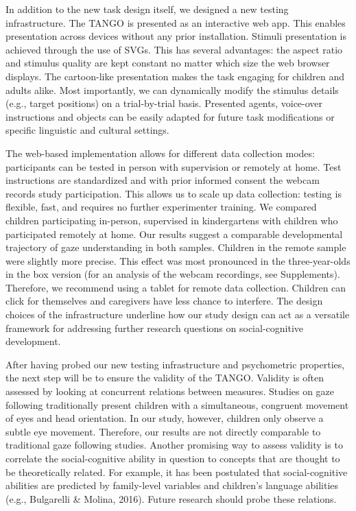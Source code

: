 \documentclass[
  man,floatsintext]{apa6}
\begin{document}
In addition to the new task design itself, we designed a new testing infrastructure.
The TANGO is presented as an interactive web app.
This enables presentation across devices without any prior installation.
Stimuli presentation is achieved through the use of SVGs.
This has several advantages: the aspect ratio and stimulus quality are kept constant no matter which size the web browser displays.
The cartoon-like presentation makes the task engaging for children and adults alike.
Most importantly, we can dynamically modify the stimulus details (e.g., target positions) on a trial-by-trial basis.
Presented agents, voice-over instructions and objects can be easily adapted for future task modifications or specific linguistic and cultural settings.

The web-based implementation allows for different data collection modes: participants can be tested in person with supervision or remotely at home.
Test instructions are standardized and with prior informed consent the webcam records study participation.
This allows us to scale up data collection: testing is flexible, fast, and requires no further experimenter training.
We compared children participating in-person, supervised in kindergartens with children who participated remotely at home.
Our results suggest a comparable developmental trajectory of gaze understanding in both samples.
Children in the remote sample were slightly more precise.
This effect was most pronounced in the three-year-olds in the box version (for an analysis of the webcam recordings, see Supplements).
Therefore, we recommend using a tablet for remote data collection.
Children can click for themselves and caregivers have less chance to interfere.
The design choices of the infrastructure underline how our study design can act as a versatile framework for addressing further research questions on social-cognitive development.

After having probed our new testing infrastructure and psychometric properties, the next step will be to ensure the validity of the TANGO.
Validity is often assessed by looking at concurrent relations between measures.
Studies on gaze following traditionally present children with a simultaneous, congruent movement of eyes and head orientation.
In our study, however, children only observe a subtle eye movement.
Therefore, our results are not directly comparable to traditional gaze following studies.
Another promising way to assess validity is to correlate the social-cognitive ability in question to concepts that are thought to be theoretically related.
For example, it has been postulated that social-cognitive abilities are predicted by family-level variables and children's language abilities (e.g., Bulgarelli \& Molina, 2016). Future research should probe these relations.
\end{document}
